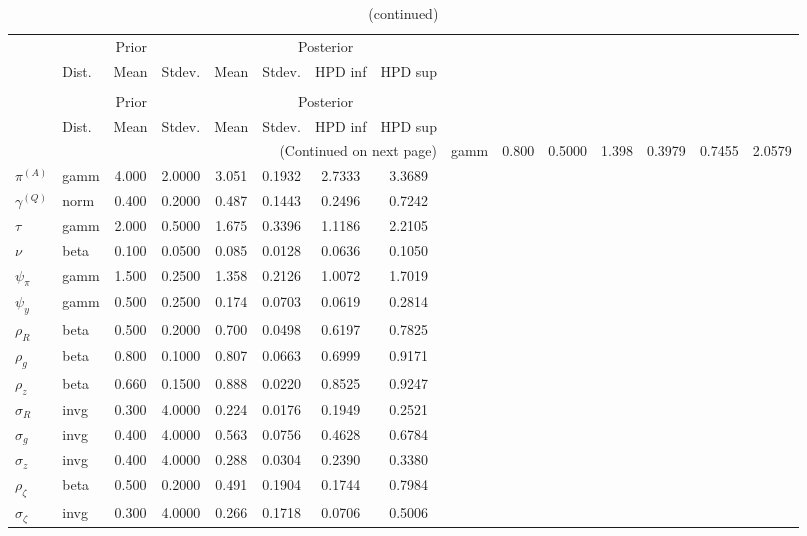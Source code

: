  
\begin{center}
\begin{longtable}{llcccccc} 
\caption{Results from Metropolis-Hastings (parameters)}
 \label{Table:MHPosterior:1}\\
\toprule 
  & \multicolumn{3}{c}{Prior}  &  \multicolumn{4}{c}{Posterior} \\
  \cmidrule(r{.75em}){2-4} \cmidrule(r{.75em}){5-8}
  & Dist. & Mean  & Stdev. & Mean & Stdev. & HPD inf & HPD sup\\
\midrule \endfirsthead 
\caption{(continued)}\\\toprule 
  & \multicolumn{3}{c}{Prior}  &  \multicolumn{4}{c}{Posterior} \\
  \cmidrule(r{.75em}){2-4} \cmidrule(r{.75em}){5-8}
  & Dist. & Mean  & Stdev. & Mean & Stdev. & HPD inf & HPD sup\\
\midrule \endhead 
\bottomrule \multicolumn{8}{r}{(Continued on next page)} \endfoot 
\bottomrule \endlastfoot 
${r_{A}}$ & gamm &   0.800 & 0.5000 &   1.398& 0.3979 &  0.7455 &  2.0579 \\ 
${\pi^{(A)}}$ & gamm &   4.000 & 2.0000 &   3.051& 0.1932 &  2.7333 &  3.3689 \\ 
${\gamma^{(Q)}}$ & norm &   0.400 & 0.2000 &   0.487& 0.1443 &  0.2496 &  0.7242 \\ 
${\tau}$ & gamm &   2.000 & 0.5000 &   1.675& 0.3396 &  1.1186 &  2.2105 \\ 
${\nu}$ & beta &   0.100 & 0.0500 &   0.085& 0.0128 &  0.0636 &  0.1050 \\ 
${\psi_\pi}$ & gamm &   1.500 & 0.2500 &   1.358& 0.2126 &  1.0072 &  1.7019 \\ 
${\psi_y}$ & gamm &   0.500 & 0.2500 &   0.174& 0.0703 &  0.0619 &  0.2814 \\ 
${\rho_R}$ & beta &   0.500 & 0.2000 &   0.700& 0.0498 &  0.6197 &  0.7825 \\ 
${\rho_{g}}$ & beta &   0.800 & 0.1000 &   0.807& 0.0663 &  0.6999 &  0.9171 \\ 
${\rho_z}$ & beta &   0.660 & 0.1500 &   0.888& 0.0220 &  0.8525 &  0.9247 \\ 
${\sigma_R}$ & invg &   0.300 & 4.0000 &   0.224& 0.0176 &  0.1949 &  0.2521 \\ 
${\sigma_{g}}$ & invg &   0.400 & 4.0000 &   0.563& 0.0756 &  0.4628 &  0.6784 \\ 
${\sigma_z}$ & invg &   0.400 & 4.0000 &   0.288& 0.0304 &  0.2390 &  0.3380 \\ 
${\rho_\zeta}$ & beta &   0.500 & 0.2000 &   0.491& 0.1904 &  0.1744 &  0.7984 \\ 
${\sigma_\zeta}$ & invg &   0.300 & 4.0000 &   0.266& 0.1718 &  0.0706 &  0.5006 \\ 
\end{longtable}
 \end{center}
